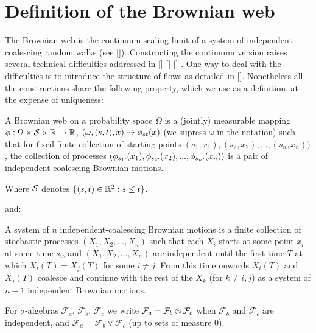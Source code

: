 {
\section{Definition of the Brownian web}

The Brownian web is the continuum scaling limit of a system of
independent coalescing random walks (see []).  Constructing the
continuum version raises several technical difficulties addressed in
[] [] [] . One way to deal with the difficulties is to introduce the
structure of flows as detailed in [].  Nonetheless all the
constructions share the following property, which we use as a
definition, at the expense of uniqueness:

\begin{definition}
  A Brownian web on a probability space $\Omega$ is a (jointly)
  measurable mapping $\phi : \Omega \times \mathcal{S} \times \mathbb{R}
  \to \mathbb{R}$, $(\omega, (s, t), x) \mapsto \phi_{{s}{t}}(x)$ (we supress
  $\omega$ in the notation) such that for fixed finite collection of
  starting points $(s_1, x_1),(s_2, x_2),...,(s_n, x_n))$, the
  collection of processes $(\phi_{{s_1}{\cdot}}(x_1),
  \phi_{{s_2}{\cdot}}(x_2),...,\phi_{{s_n}{\cdot}}(x_n))$ is a pair of
  independent-coalescing Brownian motions.
\end{definition}

\begin{notation}
  Where $\mathcal{S}$ denotes $\{(s, t) \in \mathbb{R}^2 : s \le t\}$.
\end{notation}

and:

\begin{definition} 
  \label{def:independent-coalescing-bm}
  \newcommand{\maxsym}{\vee} 
  A system of $n$ independent-coalescing Brownian motions is a finite
  collection of stochastic processes $(X_1, X_2,...,X_n)$ such that
  each $X_i$ starts at some point $x_i$ at some time $s_i$, and $(X_1,
  X_2,...,X_n)$ are independent until the first time $T$ at which
  $X_i(T)=X_j(T)$ for some $i\neq j$. From this time onwards $X_i(T)$
  and $X_j(T)$ coalesce and continue with the rest of the $X_k$ (for
  $k\neq i,j$) as a system of $n-1$ independent Brownian motions.
\end{definition}

\begin{notation}
  \newcommand{\F}{\mathcal{F}}

  For $\sigma$-algebras $\F_a$, $\F_b$, $\F_c$ we write $\F_a = \F_b
  \tensor \F_c$ when $\F_b$ and $\F_c$ are independent, and $\F_a =
  \F_b \vee \F_c$ (up to sets of measure $0$).

\end{notation}

}
